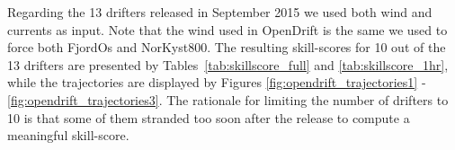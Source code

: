 Regarding the 13 drifters released in September 2015 we used both wind and currents as input. Note that the wind used in OpenDrift is the same we used to force both FjordOs and NorKyst800. The resulting skill-scores for 10 out of the 13 drifters are presented by Tables~\ref{tab:skillscore_full} and \ref{tab:skillscore_1hr}, while the trajectories are displayed by Figures \ref{fig:opendrift_trajectories1} - \ref{fig:opendrift_trajectories3}. The rationale for limiting the number of drifters to 10 is that some of them stranded too soon after the release to compute a meaningful skill-score. 

